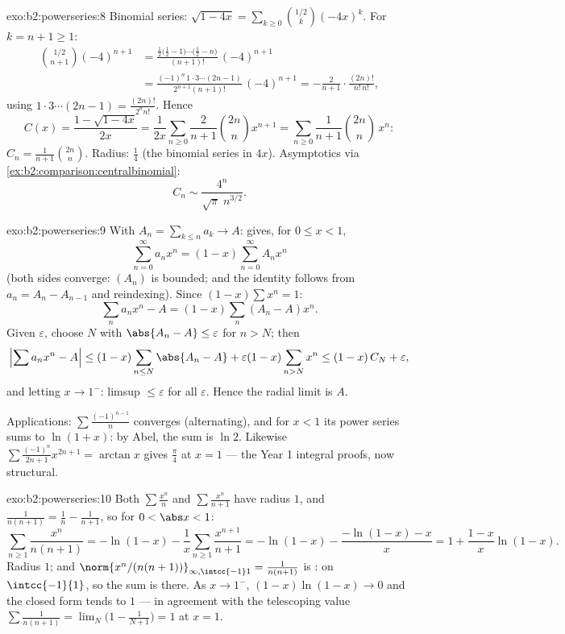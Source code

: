 \begin{solution}{exo:b2:powerseries:8}
Binomial series: $\sqrt{1-4x} = \sum_{k\geq0}
\binom{1/2}{k}(-4x)^k$. For $k = n + 1 \geq 1$:
\begin{align*}
\binom{1/2}{n+1}(-4)^{n+1}
&= \frac{\frac12\bigl(\frac12 - 1\bigr)\cdots\bigl(\frac12 -
n\bigr)}{(n+1)!}\,(-4)^{n+1}\\
&= \frac{(-1)^n\,1\cdot3\cdots(2n-1)}{2^{n+1}(n+1)!}\,(-4)^{n+1}
= -\frac{2}{n+1}\cdot\frac{(2n)!}{n!\,n!} ,
\end{align*}
using $1\cdot3\cdots(2n-1) = \frac{(2n)!}{2^n n!}$. Hence
\[
C(x) = \frac{1 - \sqrt{1-4x}}{2x}
= \frac{1}{2x}\sum_{n\geq0}\frac{2}{n+1}\binom{2n}{n}x^{n+1}
= \sum_{n\geq0} \frac{1}{n+1}\binom{2n}{n}\,x^n :
\]
$C_n = \frac{1}{n+1}\binom{2n}{n}$. Radius: $\frac14$ (the binomial
series in $4x$). Asymptotics via
\cref{ex:b2:comparison:centralbinomial}:
\[
C_n \sim \frac{4^n}{\sqrt{\pi}\; n^{3/2}} .
\]
\end{solution}

\begin{solution}{exo:b2:powerseries:9}
With $A_n = \sum_{k \leq n} a_k \to A$:  gives, for
$0 \leq x < 1$,
\[
\sum_{n=0}^{\infty} a_n x^n = (1 - x)\sum_{n=0}^{\infty} A_n x^n
\]
(both sides converge: $(A_n)$ is bounded; and the identity follows
from $a_n = A_n - A_{n-1}$ and reindexing). Since $(1 -
x)\sum x^n = 1$:
\[
\sum_n a_nx^n - A = (1-x)\sum_{n} (A_n - A)x^n .
\]
Given $\varepsilon$, choose $N$ with $\abs{A_n - A} \leq
\varepsilon$ for $n > N$; then
\[
\Bigl|\sum a_nx^n - A\Bigr|
\leq (1-x)\sum_{n \leq N}\abs{A_n - A} + \varepsilon(1 -
x)\sum_{n > N}x^n
\leq (1-x)\,C_N + \varepsilon ,
\]
and letting $x \to 1^-$: limsup $\leq \varepsilon$ for all
$\varepsilon$. Hence the radial limit is $A$.

Applications: $\sum \frac{(-1)^{n-1}}{n}$ converges (alternating),
and for $x < 1$ its power series sums to $\ln(1 + x)$: by Abel,
the sum is $\ln 2$. Likewise $\sum\frac{(-1)^n}{2n+1}x^{2n+1} =
\arctan x$ gives $\frac\pi4$ at $x = 1$ --- the Year 1 integral
proofs, now structural.
\end{solution}

\begin{solution}{exo:b2:powerseries:10}
Both $\sum\frac{x^n}{n}$ and $\sum\frac{x^n}{n+1}$ have radius
$1$, and $\frac{1}{n(n+1)} = \frac1n - \frac1{n+1}$, so for $0
< \abs x < 1$:
\[
\sum_{n\geq1}\frac{x^n}{n(n+1)}
= -\ln(1-x) - \frac1x\sum_{n\geq1}\frac{x^{n+1}}{n+1}
= -\ln(1-x) - \frac{-\ln(1-x) - x}{x}
= 1 + \frac{1-x}{x}\ln(1-x) .
\]
Radius $1$; and $\norm{x^n/(n(n+1))}_{\infty,\intcc{-1}1} =
\frac{1}{n(n+1)}$ is :  on
$\intcc{-1}{1}$, so the sum is  there. As $x \to
1^-$, $(1-x)\ln(1-x) \to 0$ and the closed form tends to $1$ ---
in agreement with the telescoping value $\sum\frac{1}{n(n+1)} =
\lim_N\bigl(1 - \frac{1}{N+1}\bigr) = 1$ at $x = 1$.
\end{solution}

